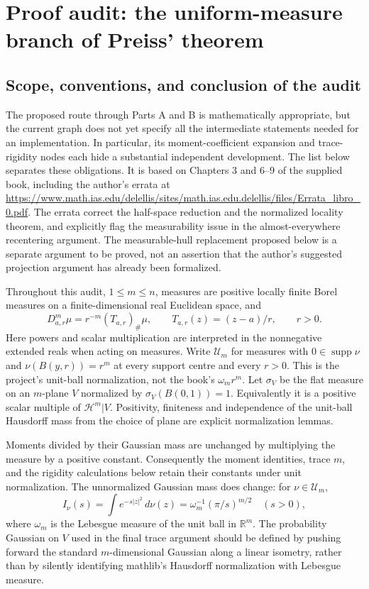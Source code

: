 \chapter{Proof audit: the uniform-measure branch of Preiss' theorem}

\section{Scope, conventions, and conclusion of the audit}
The proposed route through Parts A and B is mathematically appropriate, but the
current graph does not yet specify all the intermediate statements needed for an
implementation. In particular, its moment-coefficient expansion and trace-rigidity
nodes each hide a substantial independent development. The list below separates
these obligations. It is based on Chapters 3 and 6--9 of the supplied book, including
the author's errata at
\url{https://www.math.ias.edu/delellis/sites/math.ias.edu.delellis/files/Errata_libro_0.pdf}.
The errata correct the half-space reduction and the normalized locality theorem,
and explicitly flag the measurability issue in the almost-everywhere recentering
argument. The measurable-hull replacement proposed below is a separate argument
to be proved, not an assertion that the author's suggested projection argument has
already been formalized.

Throughout this audit, $1\leq m\leq n$, measures are positive locally finite Borel
measures on a finite-dimensional real Euclidean space, and
\[
 D^m_{a,r}\mu=r^{-m}(T_{a,r})_\#\mu,
 \qquad T_{a,r}(z)=(z-a)/r,\qquad r>0.
\]
Here powers and scalar multiplication are interpreted in the nonnegative extended
reals when acting on measures. Write $\mathcal U_m$ for measures with
$0\in\operatorname{supp}\nu$ and
$\nu(B(y,r))=r^m$ at every support centre and every $r>0$.
This is the project's unit-ball normalization, not the book's $\omega_m r^m$.
Let $\sigma_V$ be the flat measure on an $m$-plane $V$ normalized by
$\sigma_V(B(0,1))=1$. Equivalently it is a positive scalar multiple of
$\mathcal H^m|V$. Positivity, finiteness and independence of the unit-ball
Hausdorff mass from the choice of plane are explicit normalization lemmas.

Moments divided by their Gaussian mass are unchanged by multiplying the measure
by a positive constant. Consequently the moment identities, trace $m$, and the
rigidity calculations below retain their constants under unit normalization.
The unnormalized Gaussian mass does change: for $\nu\in\mathcal U_m$,
\[
 I_\nu(s)=\int e^{-s|z|^2}\,d\nu(z)
 =\omega_m^{-1}(\pi/s)^{m/2}\quad(s>0),
\]
where $\omega_m$ is the Lebesgue measure of the unit ball in $\mathbb R^m$.
The probability Gaussian on $V$ used in the final trace argument should be
defined by pushing forward the standard $m$-dimensional Gaussian along a linear
isometry, rather than by silently identifying mathlib's Hausdorff normalization
with Lebesgue measure.

